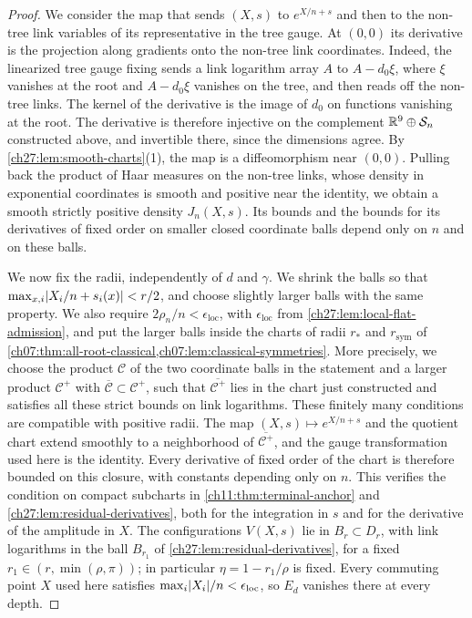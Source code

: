 \begin{proof}
We consider the map that sends $(X,s)$ to $e^{X/n+s}$ and then to the non-tree link variables of its representative in the tree gauge. At $(0,0)$ its derivative is the projection along gradients onto the non-tree link coordinates. Indeed, the linearized tree gauge fixing sends a link logarithm array $A$ to $A-d_0\xi$, where $\xi$ vanishes at the root and $A-d_0\xi$ vanishes on the tree, and then reads off the non-tree links. The kernel of the derivative is the image of $d_0$ on functions vanishing at the root. The derivative is therefore injective on the complement $\mathbb R^9\oplus\mathcal S_n$ constructed above, and invertible there, since the dimensions agree. By \cref{ch27:lem:smooth-charts}(1), the map is a diffeomorphism near $(0,0)$. Pulling back the product of Haar measures on the non-tree links, whose density in exponential coordinates is smooth and positive near the identity, we obtain a smooth strictly positive density $J_n(X,s)$. Its bounds and the bounds for its derivatives of fixed order on smaller closed coordinate balls depend only on $n$ and on these balls.

We now fix the radii, independently of $d$ and $\gamma$. We shrink the balls so that $\max_{x,i}\lvert X_i/n+s_i(x)\rvert<r/2$, and choose slightly larger balls with the same property. We also require $2\rho_n/n<\epsilon_{\mathrm{loc}}$, with $\epsilon_{\mathrm{loc}}$ from \cref{ch27:lem:local-flat-admission}, and put the larger balls inside the charts of radii $r_*$ and $r_{\mathrm{sym}}$ of \cref{ch07:thm:all-root-classical,ch07:lem:classical-symmetries}. More precisely, we choose the product $\mathcal C$ of the two coordinate balls in the statement and a larger product $\mathcal C^+$ with $\overline{\mathcal C}\subset\mathcal C^+$, such that $\overline{\mathcal C^+}$ lies in the chart just constructed and satisfies all these strict bounds on link logarithms. These finitely many conditions are compatible with positive radii. The map $(X,s)\mapsto e^{X/n+s}$ and the quotient chart extend smoothly to a neighborhood of $\overline{\mathcal C^+}$, and the gauge transformation used here is the identity. Every derivative of fixed order of the chart is therefore bounded on this closure, with constants depending only on $n$. This verifies the condition on compact subcharts in \cref{ch11:thm:terminal-anchor} and \cref{ch27:lem:residual-derivatives}, both for the integration in $s$ and for the derivative of the amplitude in $X$. The configurations $V(X,s)$ lie in $B_r\subset D_r$, with link logarithms in the ball $B_{r_1}$ of \cref{ch27:lem:residual-derivatives}, for a fixed $r_1\in(r,\min(\rho,\pi))$; in particular $\eta=1-r_1/\rho$ is fixed. Every commuting point $X$ used here satisfies $\max_i\lvert X_i\rvert/n<\epsilon_{\mathrm{loc}}$, so $E_d$ vanishes there at every depth.


\end{proof}
